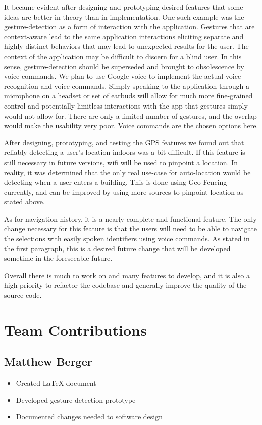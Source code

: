\documentclass{scrreprt}
\begin{document}
It became evident after designing and prototyping desired features that some ideas are better in theory than in implementation. One such example was the gesture-detection as a form of interaction with the application. Gestures that are context-aware lead to the same application interactions eliciting separate and highly distinct behaviors that may lead to unexpected results for the user. The context of the application may be difficult to discern for a blind user. In this sense, gesture-detection should be superseded and brought to obsolescence by voice commands. We plan to use Google voice to implement the actual voice recognition and voice commands. Simply speaking to the application through a microphone on a headset or set of earbuds will allow for much more fine-grained control and potentially limitless interactions with the app that gestures simply would not allow for. There are only a limited number of gestures, and the overlap would make the usability very poor. Voice commands are the chosen options here.

After designing, prototyping, and testing the GPS features we found out that reliably detecting a user's location indoors was a bit difficult. If this feature is still necessary in future versions, wifi will be used to pinpoint a location. In reality, it was determined that the only real use-case for auto-location would be detecting when a user enters a building. This is done using Geo-Fencing currently, and can be improved by using more sources to pinpoint location as stated above.

As for navigation history, it is a nearly complete and functional feature. The only change necessary for this feature is that the users will need to be able to navigate the selections with easily spoken identifiers using voice commands. As stated in the first paragraph, this is a desired future change that will be developed sometime in the foreseeable future.

Overall there is much to work on and many features to develop, and it is also a high-priority to refactor the codebase and generally improve the quality of the source code.

\chapter{Team Contributions}
	\section{Matthew Berger}
		\begin{itemize}
			\item Created LaTeX document
			\item Developed gesture detection prototype
			\item Documented changes needed to software design
		\end{itemize}
\end{document}
